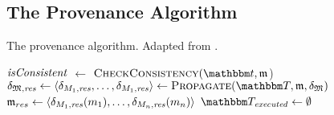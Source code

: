 \subsection{The Provenance Algorithm}

\begin{algorithm}
	\caption{The provenance algorithm. Adapted from \cite{gleitze2020orchestration}.}
	\label{algo:orchestration:provenance}
	

    \begin{algorithmic}[1]
        \State $\mathit{isConsistent}$ $\leftarrow$ $\function{CheckConsistency}(\transformationset{t}, \modeltuple{m}$)
            \State \Return{$\bot$} \label{algo:orchestration:provenance:line:bot_input}
        \EndIf
        \State $\changetuple{\metamodeltuple{M},\mathvariable{res}} \gets \tupled{\change{\metamodel{M}{1}, \mathvariable{res}}, \dots, \change{\metamodel{M}{1}, \mathvariable{res}}} \gets \function{Propagate}(\transformationset{T}, \modeltuple{m}, \changetuple{\metamodeltuple{M}})$
            \State \Return{$\bot$} \label{algo:orchestration:provenance:line:bot_orchestration}
        \EndIf
        \State $\mathfrak{m}_{res} \leftarrow \langle \delta_{M_{1},\mathit{res}}(m_{1}), \dots, \delta_{M_{n},\mathit{res}}(m_{n}) \rangle$
        \State {} \label{algo:orchestration:provenance:line:return_result}
    \EndProcedure
    \vspace{\baselineskip}
        \vspace{0.15\baselineskip}
        \State $\provalgexecuted \gets \emptyset$ \label{algo:orchestration:provenance:line:executed_init}
        \vspace{0.3\baselineskip}
        

\end{algorithmic}
\end{algorithm}
